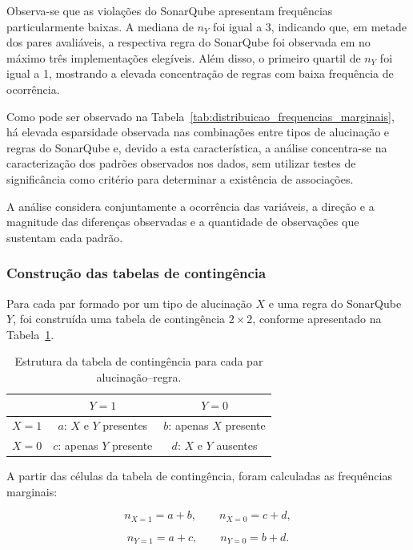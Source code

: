 Observa-se que as violações do SonarQube apresentam frequências
particularmente baixas. A mediana de $n_Y$ foi igual a 3, indicando
que, em metade dos pares avaliáveis, a respectiva regra do SonarQube
foi observada em no máximo três implementações elegíveis. Além disso,
o primeiro quartil de $n_Y$ foi igual a 1, mostrando a elevada
concentração de regras com baixa frequência de ocorrência.

Como pode ser observado na Tabela~\ref{tab:distribuicao_frequencias_marginais}, há elevada esparsidade observada nas combinações entre tipos de alucinação e regras do SonarQube e, devido a esta característica, a análise concentra-se na caracterização dos padrões observados nos dados, sem utilizar testes de significância como critério para determinar a existência de associações.

A análise considera conjuntamente a ocorrência das variáveis, a direção e a magnitude das diferenças observadas e a quantidade de observações que sustentam cada padrão.

\subsubsection{Construção das tabelas de contingência}

Para cada par formado por um tipo de alucinação $X$ e uma regra do
SonarQube $Y$, foi construída uma tabela de contingência $2\times2$,
conforme apresentado na Tabela~\ref{tab:contingencia}.

\begin{table}[ht]
    \centering
    \caption{Estrutura da tabela de contingência para cada par
    alucinação--regra.}
    \label{tab:contingencia}
    \begin{tabular}{lcc}
        \hline
        & $Y=1$ & $Y=0$ \\ 
        \hline
        $X=1$ 
        & $a$: $X$ e $Y$ presentes
        & $b$: apenas $X$ presente \\

        $X=0$
        & $c$: apenas $Y$ presente
        & $d$: $X$ e $Y$ ausentes \\
        \hline
    \end{tabular}
\end{table}

A partir das células da tabela de contingência, foram calculadas as
frequências marginais:

\[
n_{X=1}=a+b,
\qquad
n_{X=0}=c+d,
\]

\[
n_{Y=1}=a+c,
\qquad
n_{Y=0}=b+d.
\]

